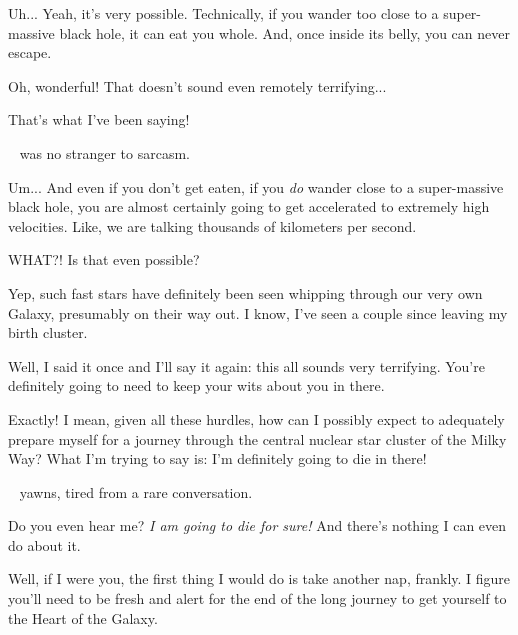 \documentclass[main.tex]{subfiles}
\begin{document}
\par \Electra Uh... Yeah, it's very possible.  Technically, if you wander too close to a super-massive black hole, it can eat you whole.  And, once inside its belly, you can never escape.

\par \Dardanus  Oh, wonderful!  That doesn't sound even remotely terrifying...

\par \Electra That's what I've been saying!

\par \nar \rmdardanus~ was no stranger to sarcasm.

\par \Electra Um... And even if you don't get eaten, if you \textit{do} wander close to a super-massive black hole, you are almost certainly going to get accelerated to extremely high velocities.  Like, we are talking thousands of kilometers per second.

\par \Dardanus  WHAT?!  Is that even possible?

\par \Electra  Yep, such fast stars have definitely been seen whipping through our very own Galaxy, presumably on their way out.  I know, I've seen a couple since leaving my birth cluster.

\par \Dardanus Well, I said it once and I'll say it again:  this all sounds very terrifying. You're definitely going to need to keep your wits about you in there.

\par \Electra Exactly!  I mean, given all these hurdles, how can I possibly expect to adequately prepare myself for a journey through the central nuclear star cluster of the Milky Way?  What I'm trying to say is:  I'm definitely going to die in there!

\par \nar \rmdardanus~ yawns, tired from a rare conversation.  

\par \Electra  Do you even hear me?  \textit{I am going to die for sure!}  And there's nothing I can even do about it.

\par \Dardanus Well, if I were you, the first thing I would do is take another nap, frankly.  I figure you'll need to be fresh and alert for the end of the long journey to get yourself to the Heart of the Galaxy.
\end{document}
